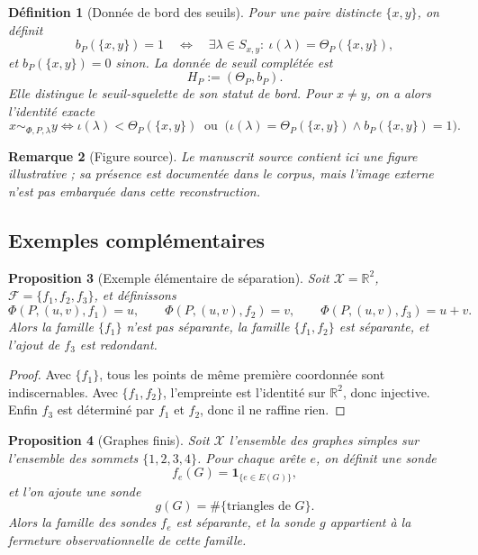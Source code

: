 \documentclass[11pt,a4paper,openany]{book}
\newtheorem{definition}{Définition}[chapter]
\newtheorem{proposition}[definition]{Proposition}
\newtheorem{remark}[definition]{Remarque}
\begin{document}
\begin{definition}[Donnée de bord des seuils]
Pour une paire distincte \(\{x,y\}\), on définit
\[
b_P(\{x,y\})=1
\quad\Longleftrightarrow\quad
\exists\lambda\in S_{x,y}:\ \iota(\lambda)=\Theta_P(\{x,y\}),
\]
et \(b_P(\{x,y\})=0\) sinon. La donnée de seuil complétée est
\[
H_P:=(\Theta_P,b_P).
\]
Elle distingue le seuil-squelette de son statut de bord. Pour \(x\ne y\), on a alors l'identité exacte
\[
x\sim_{\Phi,P,\lambda}y
\Longleftrightarrow
\iota(\lambda)<\Theta_P(\{x,y\})
\ \text{ ou }\ 
\bigl(\iota(\lambda)=\Theta_P(\{x,y\})\land b_P(\{x,y\})=1\bigr).
\]
\end{definition}

\begin{remark}[Figure source]
Le manuscrit source contient ici une figure illustrative ; sa présence est documentée dans le corpus, mais l'image externe n'est pas embarquée dans cette reconstruction.
\end{remark}

\subsection{Exemples complémentaires}

\begin{proposition}[Exemple élémentaire de séparation]
Soit \(\mathcal X=\mathbb R^2\), \(\mathcal F=\{f_1,f_2,f_3\}\), et définissons
\[
\Phi(P,(u,v),f_1)=u,\qquad
\Phi(P,(u,v),f_2)=v,\qquad
\Phi(P,(u,v),f_3)=u+v.
\]
Alors la famille \(\{f_1\}\) n'est pas séparante, la famille \(\{f_1,f_2\}\) est séparante, et l'ajout de \(f_3\) est redondant.
\end{proposition}

\begin{proof}
Avec \(\{f_1\}\), tous les points de même première coordonnée sont indiscernables. Avec \(\{f_1,f_2\}\), l'empreinte est l'identité sur \(\mathbb R^2\), donc injective. Enfin \(f_3\) est déterminé par \(f_1\) et \(f_2\), donc il ne raffine rien.
\end{proof}

\begin{proposition}[Graphes finis]
Soit \(\mathcal X\) l'ensemble des graphes simples sur l'ensemble des sommets \(\{1,2,3,4\}\). Pour chaque arête \(e\), on définit une sonde
\[
f_e(G)=\mathbf 1_{\{e\in E(G)\}},
\]
et l'on ajoute une sonde
\[
g(G)=\#\{\text{triangles de }G\}.
\]
Alors la famille des sondes \(f_e\) est séparante, et la sonde \(g\) appartient à la fermeture observationnelle de cette famille.
\end{proposition}
\end{document}
